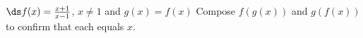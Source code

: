 {$\ds f(x) = \frac{x+1}{x-1}$, $x\neq 1$ and $g(x) = f(x)$}
{Compose $f(g(x))$ and $g(f(x))$ to confirm that each equals $x$.
}
